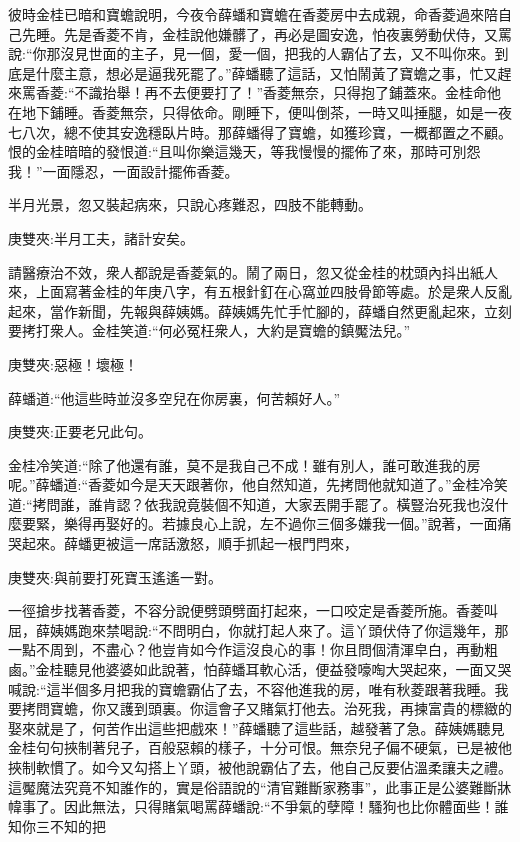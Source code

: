 \begin{parag}
    彼時金桂已暗和寶蟾說明，今夜令薛蟠和寶蟾在香菱房中去成親，命香菱過來陪自己先睡。先是香菱不肯，金桂說他嫌髒了，再必是圖安逸，怕夜裏勞動伏侍，又罵說:“你那沒見世面的主子，見一個，愛一個，把我的人霸佔了去，又不叫你來。到底是什麼主意，想必是逼我死罷了。”薛蟠聽了這話，又怕鬧黃了寶蟾之事，忙又趕來罵香菱:“不識抬舉！再不去便要打了！”香菱無奈，只得抱了鋪蓋來。金桂命他在地下鋪睡。香菱無奈，只得依命。剛睡下，便叫倒茶，一時又叫捶腿，如是一夜七八次，總不使其安逸穩臥片時。那薛蟠得了寶蟾，如獲珍寶，一概都置之不顧。恨的金桂暗暗的發恨道:“且叫你樂這幾天，等我慢慢的擺佈了來，那時可別怨我！”一面隱忍，一面設計擺佈香菱。
\end{parag}


\begin{parag}
    半月光景，忽又裝起病來，只說心疼難忍，四肢不能轉動。\begin{note}庚雙夾:半月工夫，諸計安矣。\end{note}請醫療治不效，衆人都說是香菱氣的。鬧了兩日，忽又從金桂的枕頭內抖出紙人來，上面寫著金桂的年庚八字，有五根針釘在心窩並四肢骨節等處。於是衆人反亂起來，當作新聞，先報與薛姨媽。薛姨媽先忙手忙腳的，薛蟠自然更亂起來，立刻要拷打衆人。金桂笑道:“何必冤枉衆人，大約是寶蟾的鎮魘法兒。”\begin{note}庚雙夾:惡極！壞極！\end{note}薛蟠道:“他這些時並沒多空兒在你房裏，何苦賴好人。”\begin{note}庚雙夾:正要老兄此句。\end{note}金桂冷笑道:“除了他還有誰，莫不是我自己不成！雖有別人，誰可敢進我的房呢。”薛蟠道:“香菱如今是天天跟著你，他自然知道，先拷問他就知道了。”金桂冷笑道:“拷問誰，誰肯認？依我說竟裝個不知道，大家丟開手罷了。橫豎治死我也沒什麼要緊，樂得再娶好的。若據良心上說，左不過你三個多嫌我一個。”說著，一面痛哭起來。薛蟠更被這一席話激怒，順手抓起一根門閂來，\begin{note}庚雙夾:與前要打死寶玉遙遙一對。\end{note}一徑搶步找著香菱，不容分說便劈頭劈面打起來，一口咬定是香菱所施。香菱叫屈，薛姨媽跑來禁喝說:“不問明白，你就打起人來了。這丫頭伏侍了你這幾年，那一點不周到，不盡心？他豈肯如今作這沒良心的事！你且問個清渾皁白，再動粗鹵。”金桂聽見他婆婆如此說著，怕薛蟠耳軟心活，便益發嚎啕大哭起來，一面又哭喊說:“這半個多月把我的寶蟾霸佔了去，不容他進我的房，唯有秋菱跟著我睡。我要拷問寶蟾，你又護到頭裏。你這會子又賭氣打他去。治死我，再揀富貴的標緻的娶來就是了，何苦作出這些把戲來！”薛蟠聽了這些話，越發著了急。薛姨媽聽見金桂句句挾制著兒子，百般惡賴的樣子，十分可恨。無奈兒子偏不硬氣，已是被他挾制軟慣了。如今又勾搭上丫頭，被他說霸佔了去，他自己反要佔溫柔讓夫之禮。這魘魔法究竟不知誰作的，實是俗語說的“清官難斷家務事”，此事正是公婆難斷牀幃事了。因此無法，只得賭氣喝罵薛蟠說:“不爭氣的孽障！騷狗也比你體面些！誰知你三不知的把
\end{parag}
